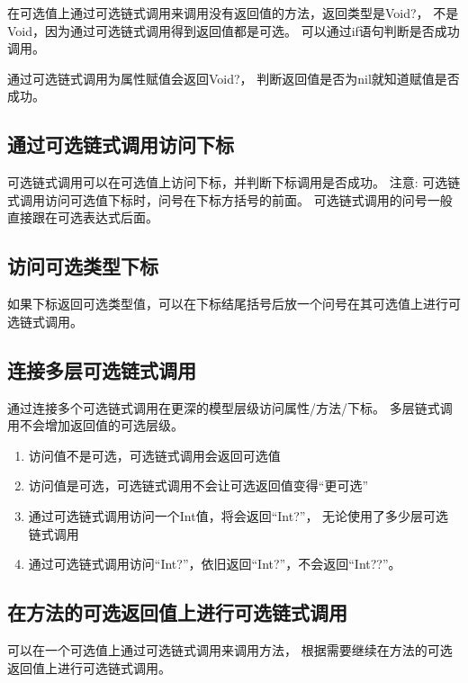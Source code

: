 \documentclass{../main.tex}{subfiles}
\begin{document}
在可选值上通过可选链式调用来调用没有返回值的方法，返回类型是Void?，
不是Void，因为通过可选链式调用得到返回值都是可选。
可以通过if语句判断是否成功调用。

通过可选链式调用为属性赋值会返回Void?， 判断返回值是否为nil就知道赋值是否成功。

\subsection{通过可选链式调用访问下标}
可选链式调用可以在可选值上访问下标，并判断下标调用是否成功。
注意: 可选链式调用访问可选值下标时，问号在下标方括号的前面。
可选链式调用的问号一般直接跟在可选表达式后面。

\subsection{访问可选类型下标}
如果下标返回可选类型值，可以在下标结尾括号后放一个问号在其可选值上进行可选链式调用。

\subsection{连接多层可选链式调用}
通过连接多个可选链式调用在更深的模型层级访问属性/方法/下标。
多层链式调用不会增加返回值的可选层级。
\begin{enumerate}[itemsep=0pt, parsep=0pt, topsep=0pt, partopsep=0pt]
  \item 访问值不是可选，可选链式调用会返回可选值
  \item 访问值是可选，可选链式调用不会让可选返回值变得``更可选''
  \item 通过可选链式调用访问一个Int值，将会返回``Int?''，
    无论使用了多少层可选链式调用
  \item 通过可选链式调用访问``Int?''，依旧返回``Int?''，不会返回``Int??''。
\end{enumerate}

\subsection{在方法的可选返回值上进行可选链式调用}
可以在一个可选值上通过可选链式调用来调用方法，
根据需要继续在方法的可选返回值上进行可选链式调用。

\end{document}
